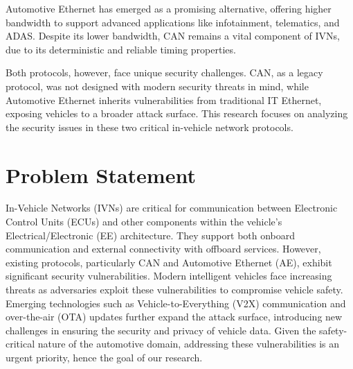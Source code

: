 \documentclass{report}
\begin{document}
Automotive Ethernet has emerged as a promising alternative, offering higher bandwidth to support advanced applications like infotainment, telematics, and ADAS.  Despite its lower bandwidth, CAN remains a vital component of IVNs, due to its deterministic and reliable timing properties.

Both protocols, however, face unique security challenges. CAN, as a legacy protocol, was not designed with modern security threats in mind, while Automotive Ethernet inherits vulnerabilities from traditional IT Ethernet, exposing vehicles to a broader attack surface. This research focuses on analyzing the security issues in these two critical in-vehicle network protocols.

\section{Problem Statement}
In-Vehicle Networks (IVNs) are critical for communication between Electronic Control Units (ECUs) and other components within the vehicle's Electrical/Electronic (EE) architecture. They support both onboard communication and external connectivity with offboard services. However, existing protocols, particularly CAN and Automotive Ethernet (AE), exhibit significant security vulnerabilities.
Modern intelligent vehicles face increasing threats as adversaries exploit these vulnerabilities to compromise vehicle safety. Emerging technologies such as Vehicle-to-Everything (V2X) communication and over-the-air (OTA) updates further expand the attack surface, introducing new challenges in ensuring the security and privacy of vehicle data. Given the safety-critical nature of the automotive domain, addressing these vulnerabilities is an urgent priority, hence the goal of our research.

\end{document}
